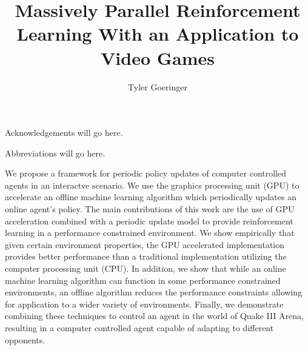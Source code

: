 \clearpage{}

\title{Massively Parallel Reinforcement Learning With an Application to Video Games}
\author{Tyler Goeringer}
\date{}
\maketitle


\committeeapprovalpage

\begin{acknowledgments}
    Acknowledgements will go here.
\end{acknowledgments}

\tableofcontents
\listoftables
\listoffigures

\begin{abbreviations}
    Abbreviations will go here.
\end{abbreviations}

\begin{umiabstract}
    We propose a framework for periodic policy updates of computer controlled agents in an interactve scenario. We use the graphics processing unit (GPU) to accelerate an offline machine learning algorithm which periodically updates an online agent's policy. The main contributions of this work are the use of GPU acceleration combined with a periodic update model to provide reinforcement learning in a performance constrained environment. We show empirically that given certain environment properties, the GPU accelerated implementation provides better performance than a traditional implementation utilizing the computer processing unit (CPU). In addition, we show that while an online machine learning algorithm can function in some performance constrained environments, an offline algorithm reduces the performance constraints allowing for application to a wider variety of environments. Finally, we demonstrate combining these techniques to control an agent in the world of Quake III Arena, resulting in a computer controlled agent capable of adapting to different opponents.
\end{umiabstract}

\clearpage{}